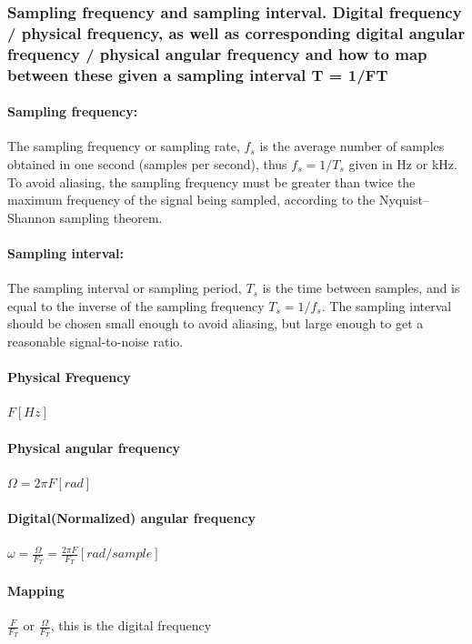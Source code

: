 \documentclass{article}
\begin{document}
\subsubsection{Sampling frequency and sampling interval. Digital frequency / physical frequency, as well as
corresponding digital angular frequency / physical angular frequency and how to map between these
given a sampling interval T = 1/FT}

\paragraph{Sampling frequency:}
The sampling frequency or sampling rate, $f_s$ is the average number of samples obtained in one second (samples per second), thus $f_s = 1/T_s$ given in Hz or kHz. To avoid aliasing, the sampling frequency must be greater than twice the maximum frequency of the signal being sampled, according to the Nyquist–Shannon sampling theorem.

\paragraph{Sampling interval:}
The sampling interval or sampling period, $T_s$ is the time between samples, and is equal to the inverse of the sampling frequency $T_s = 1/f_s$. The sampling interval should be chosen small enough to avoid aliasing, but large enough to get a reasonable signal-to-noise ratio.

\paragraph{Physical Frequency} $F[Hz]$

\paragraph{Physical angular frequency} $\Omega = 2\pi F [rad]$

\paragraph{Digital(Normalized) angular frequency} $\omega = \frac{\Omega}{F_T} =  \frac{2\pi F}{F_T} [rad/sample]$

\paragraph{Mapping} $\frac{F}{F_T}$ or $\frac{\Omega}{F_T}$, this is the digital frequency
\end{document}
